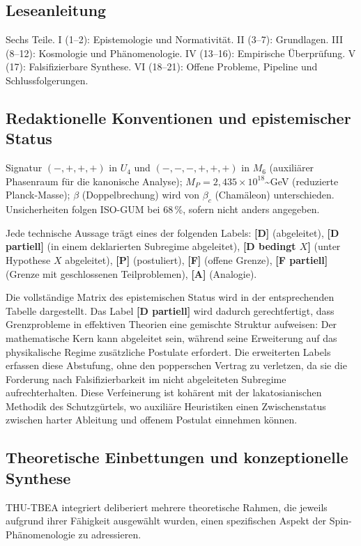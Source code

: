 ﻿\documentclass[11pt,letterpaper]{article}
\begin{document}
\subsection{Leseanleitung}
Sechs Teile. I (1--2): Epistemologie und Normativität. II (3--7): Grundlagen. III (8--12): Kosmologie und Phänomenologie. IV (13--16): Empirische Überprüfung. V (17): Falsifizierbare Synthese. VI (18--21): Offene Probleme, Pipeline und Schlussfolgerungen.
\subsection{Redaktionelle Konventionen und epistemischer Status}
Signatur $(-,+,+,+)$ in $U_4$ und $(-,-,-,+,+,+)$ in $M_6$ (auxiliärer Phasenraum für die kanonische Analyse); $M_P = 2{,}435 \times 10^{18}$\textasciitilde{}GeV (reduzierte Planck-Masse); $\beta$ (Doppelbrechung) wird von $\beta_c$ (Chamäleon) unterschieden. Unsicherheiten folgen ISO-GUM bei 68\,\%, sofern nicht anders angegeben.

Jede technische Aussage trägt eines der folgenden Labels: \textbf{[D]} (abgeleitet), \textbf{[D partiell]} (in einem deklarierten Subregime abgeleitet), \textbf{[D bedingt $X$]} (unter Hypothese $X$ abgeleitet), \textbf{[P]} (postuliert), \textbf{[F]} (offene Grenze), \textbf{[F partiell]} (Grenze mit geschlossenen Teilproblemen), \textbf{[A]} (Analogie).

Die vollständige Matrix des epistemischen Status wird in der entsprechenden Tabelle dargestellt. Das Label \textbf{[D partiell]} wird dadurch gerechtfertigt, dass Grenzprobleme in effektiven Theorien eine gemischte Struktur aufweisen: Der mathematische Kern kann abgeleitet sein, während seine Erweiterung auf das physikalische Regime zusätzliche Postulate erfordert. Die erweiterten Labels erfassen diese Abstufung, ohne den popperschen Vertrag zu verletzen, da sie die Forderung nach Falsifizierbarkeit im nicht abgeleiteten Subregime aufrechterhalten. Diese Verfeinerung ist kohärent mit der lakatosianischen Methodik des Schutzgürtels, wo auxiliäre Heuristiken einen Zwischenstatus zwischen harter Ableitung und offenem Postulat einnehmen können.
\subsection{Theoretische Einbettungen und konzeptionelle Synthese}
THU-TBEA integriert deliberiert mehrere theoretische Rahmen, die jeweils aufgrund ihrer Fähigkeit ausgewählt wurden, einen spezifischen Aspekt der Spin-Phänomenologie zu adressieren.
\end{document}
